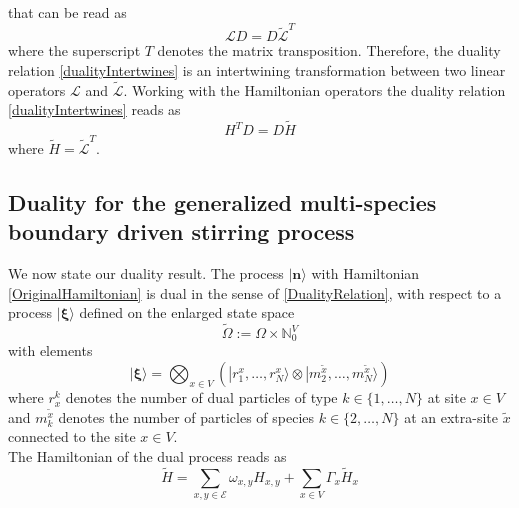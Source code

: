\documentclass[11pt]{article}
\numberwithin{equation}{section}
\numberwithin{equation}{subsection}
\begin{document}
that can be read as
\begin{equation}\label{dualityIntertwines}
    \mathcal{L}D=D\widetilde{\mathcal{L}}^{T}
\end{equation}
where the superscript $T$ denotes the matrix transposition. Therefore, the duality relation \eqref{dualityIntertwines} is an intertwining transformation between two linear operators $\mathcal{L}$ and $\widetilde{\mathcal{L}}$. Working with the Hamiltonian operators the duality relation \eqref{dualityIntertwines} reads as
\begin{equation}\label{DualityRelation}
    H^{T}D=D\widetilde{H}
\end{equation}
where $\widetilde{H}=\widetilde{\mathcal{L}}^{T}$.
\subsection{Duality for the generalized multi-species boundary driven stirring process}
We now state our duality result. The process $|\mathbf{n}\rangle$ with Hamiltonian \eqref{OriginalHamiltonian} is dual in the sense of \eqref{DualityRelation}, with respect to a process $|\bm{\xi}\rangle$ defined on the enlarged state space
\begin{equation}
    \widetilde{\Omega}:=\Omega\times \mathbb{N}_{0}^{V}
\end{equation}
with elements
\begin{equation}
    |\bm{\xi}\rangle=\bigotimes_{x\in V}\left(|r_{1}^{x},\ldots,r_{N}^{x}\rangle\otimes |m_{2}^{\widetilde{x}},\ldots,m_{N}^{\widetilde{x}}\rangle\right)
\end{equation}
where $r_{x}^{k}$ denotes the number of dual particles of type $k\in \{1,\ldots,N\}$ at site $x\in V$ and $m_{k}^{\widetilde{x}}$ denotes the number of particles of species $k\in \{2,\ldots,N\}$ at an extra-site $\widetilde{x}$ connected to the site $x\in V$.\\
The Hamiltonian of the dual process reads as
\begin{equation}\label{DualHamiltonian}
    \widetilde{H}=\sum_{x,y\in \mathcal{E}}\omega_{x,y}H_{x,y}+\sum_{x\in V}\Gamma_{x}\widetilde{H}_{x}
\end{equation}
\end{document}
